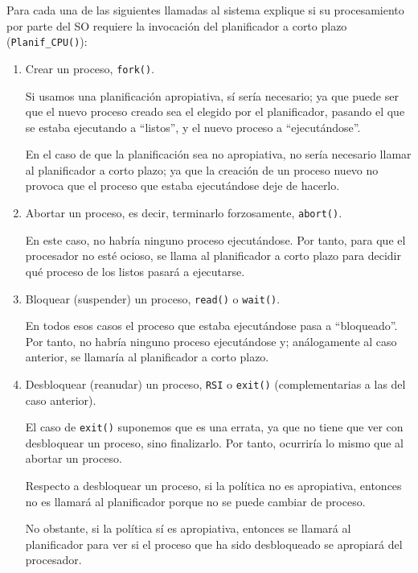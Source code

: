\begin{ejercicio}
    Para cada una de las siguientes llamadas al sistema explique si su procesamiento por parte
    del SO requiere la invocación del planificador a corto plazo (\verb|Planif_CPU()|):
    \begin{enumerate}
        \item  Crear un proceso, \verb|fork()|.

        Si usamos una planificación apropiativa, sí sería necesario; ya que puede ser que el nuevo proceso creado sea el elegido por el planificador, pasando el que se estaba ejecutando a ``listos'', y el nuevo proceso a ``ejecutándose''.

        En el caso de que la planificación sea no apropiativa, no sería necesario llamar al planificador a corto plazo; ya que la creación de un proceso nuevo no provoca que el proceso que estaba ejecutándose deje de hacerlo.
        
        \item  Abortar un proceso, es decir, terminarlo forzosamente, \verb|abort()|.

        En este caso, no habría ninguno proceso ejecutándose. Por tanto, para que el procesador no esté ocioso, se llama al planificador a corto plazo para decidir qué proceso de los listos pasará a ejecutarse.

        
        \item  Bloquear (suspender) un proceso, \verb|read()| o \verb|wait()|.

        En todos esos casos el proceso que estaba ejecutándose pasa a ``bloqueado''. Por tanto, no habría ninguno proceso ejecutándose y; análogamente al caso anterior, se llamaría al planificador a corto plazo.
        
        \item  Desbloquear (reanudar) un proceso, \verb|RSI| o \verb|exit()| (complementarias a las del caso anterior).

        El caso de \verb|exit()| suponemos que es una errata, ya que no tiene que ver con desbloquear un proceso, sino finalizarlo. Por tanto, ocurriría lo mismo que al abortar un proceso.

        Respecto a desbloquear un proceso, si la política no es apropiativa, entonces no es llamará al planificador porque no se puede cambiar de proceso.

        No obstante, si la política sí es apropiativa, entonces se llamará al planificador para ver si el proceso que ha sido desbloqueado se apropiará del procesador.
        

\end{enumerate}
\end{ejercicio}
